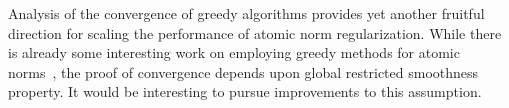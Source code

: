 Analysis of the convergence of greedy algorithms provides yet another fruitful
direction for scaling the performance of atomic norm regularization. While there
is already some interesting work on employing greedy methods for atomic
norms~\cite{tewari2011greedy,raogreedy}, the proof of convergence depends upon
global restricted smoothness property. It would be interesting to pursue
improvements to this assumption.

% 
% 





